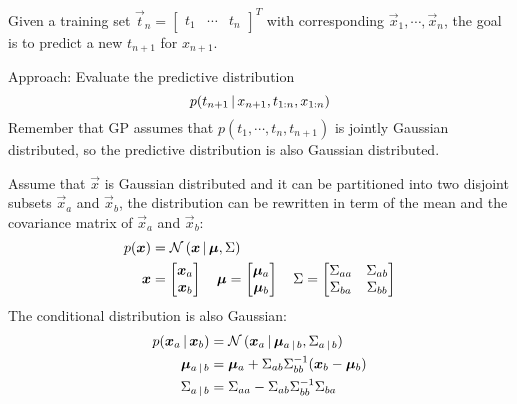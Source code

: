 			Given a training set \( \vec{t}_n = \begin{bmatrix} t_1 & \cdots & t_n \end{bmatrix}^T \) with corresponding \( \vec{x}_1, \cdots, \vec{x}_n \), the goal is to predict a new \( t_{n + 1} \) for \( x_{n + 1} \).
			
			Approach: Evaluate the predictive distribution
			\begin{equation}
				p(t_{n + 1} \,\vert\, x_{n + 1}, t_{1:n}, x_{1:n})
			\end{equation}
			Remember that GP assumes that \( p(t_1, \cdots, t_n, t_{n + 1}) \) is jointly Gaussian distributed, so the predictive distribution is also Gaussian distributed.
			
			Assume that \(\vec{x}\) is Gaussian distributed and it can be partitioned into two disjoint subsets \( \vec{x}_a \) and \( \vec{x}_b \), the distribution can be rewritten in term of the mean and the covariance matrix of \(\vec{x}_a\) and \(\vec{x}_b\):
			\begin{align}
				p(\bm{x}) &= \mathcal{N}\,(\bm{x} \,\vert\, \bm{\mu}, \Sigma) \\
					\bm{x} &= \begin{bmatrix} \bm{x}_a \\ \bm{x}_b \end{bmatrix} \quad \bm{\mu} = \begin{bmatrix} \bm{\mu}_a \\ \bm{\mu}_b \end{bmatrix} \quad \Sigma = \begin{bmatrix} \Sigma_{aa} & \Sigma_{ab} \\ \Sigma_{ba} & \Sigma_{bb} \end{bmatrix}
			\end{align}
			The conditional distribution is also Gaussian:
			\begin{align}
				p(\bm{x}_a \,\vert\, \bm{x}_b) &= \mathcal{N}\,(\bm{x}_a \,\vert\, \bm{\mu}_{a \,\vert\, b}, \Sigma_{a \,\vert\, b}) \\
					\bm{\mu}_{a \,\vert\, b} &= \bm{\mu}_a + \Sigma_{ab} \Sigma_{bb}^{-1} (\bm{x}_b - \bm{\mu}_b) \\
					\Sigma_{a \,\vert\, b} &= \Sigma_{aa} - \Sigma_{ab} \Sigma_{bb}^{-1} \Sigma_{ba}
			\end{align}
			
